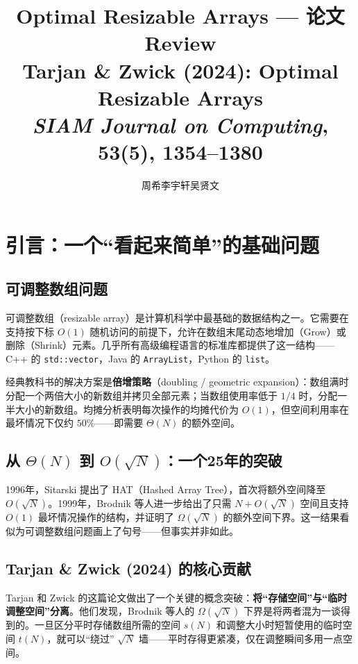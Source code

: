 \documentclass[12pt,a4paper]{ctexart}
\title{{\bfseries Optimal Resizable Arrays — 论文 Review}\\[6pt]
\large Tarjan \& Zwick (2024): Optimal Resizable Arrays\\
\textit{SIAM Journal on Computing}, 53(5), 1354--1380}
\author{周希\quad 李宇轩\quad 吴贤文}
\date{}
\begin{document}
\maketitle
\thispagestyle{empty}

\tableofcontents

\newpage

\section{引言：一个``看起来简单''的基础问题}

\subsection{可调整数组问题}

可调整数组（resizable array）是计算机科学中最基础的数据结构之一。它需要在支持按下标 $O(1)$ 随机访问的前提下，允许在数组末尾动态地增加（Grow）或删除（Shrink）元素。几乎所有高级编程语言的标准库都提供了这一结构——C++ 的 \texttt{std::vector}，Java 的 \texttt{ArrayList}，Python 的 \texttt{list}。

经典教科书的解决方案是\textbf{倍增策略}（doubling / geometric expansion）：数组满时分配一个两倍大小的新数组并拷贝全部元素；当数组使用率低于 $1/4$ 时，分配一半大小的新数组。均摊分析表明每次操作的均摊代价为 $O(1)$，但空间利用率在最坏情况下仅约 $50\%$——即需要 $\Theta(N)$ 的额外空间。

\subsection{从 $\Theta(N)$ 到 $O(\sqrt{N})$：一个25年的突破}

1996年，Sitarski 提出了 HAT（Hashed Array Tree），首次将额外空间降至 $O(\sqrt{N})$。1999年，Brodnik 等人进一步给出了只需 $N + O(\sqrt{N})$ 空间且支持 $O(1)$ 最坏情况操作的结构，并证明了 $\Omega(\sqrt{N})$ 的额外空间下界。这一结果看似为可调整数组问题画上了句号——但事实并非如此。

\subsection{Tarjan \& Zwick (2024) 的核心贡献}

Tarjan 和 Zwick 的这篇论文做出了一个关键的概念突破：\textbf{将``存储空间''与``临时调整空间''分离}。他们发现，Brodnik 等人的 $\Omega(\sqrt{N})$ 下界是将两者混为一谈得到的。一旦区分平时存储数组所需的空间 $s(N)$ 和调整大小时短暂使用的临时空间 $t(N)$，就可以``绕过'' $\sqrt{N}$ 墙——平时存得更紧凑，仅在调整瞬间多用一点空间。
\end{document}

